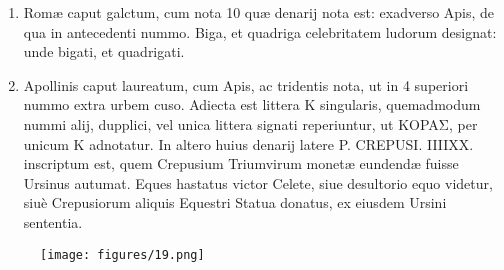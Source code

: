 \documentclass[a4paper, 11pt, oneside, polutonikogreek, latin]{article}
\begin{document}
\begin{enumerate}
    \item Romæ caput galctum, cum nota 10 quæ denarij nota est: exadverso Apis, de qua in antecedenti nummo. Biga, et quadriga celebritatem ludorum designat: unde bigati, et quadrigati.

    \item Apollinis caput laureatum, cum Apis, ac tridentis nota, ut in 4 superiori nummo extra urbem cuso. Adiecta est littera K singularis, quemadmodum nummi alij, dupplici, vel unica littera signati reperiuntur, ut KOPAΣ, per unicum K adnotatur. In altero huius denarij latere P. CREPUSI. IIIIXX. inscriptum est, quem Crepusium Triumvirum monetæ eundendæ fuisse Ursinus autumat. Eques hastatus victor Celete, siue desultorio equo videtur, siuè Crepusiorum aliquis Equestri Statua donatus, ex eiusdem Ursini sententia.
\end{enumerate}
\clearpage
\vspace*{\fill}
\begin{figure}[H]
\centering
\texttt{[image: figures/19.png]}
\end{figure}
\vspace*{\fill}
\clearpage
\end{document}
